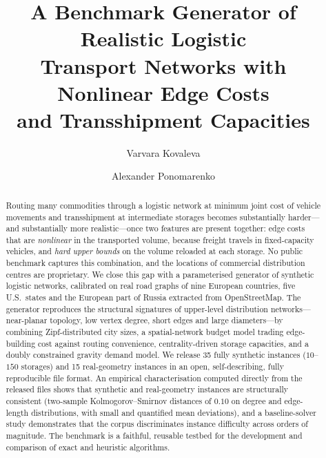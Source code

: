 \documentclass[runningheads]{llncs}
\begin{document}
\title{A Benchmark Generator of Realistic Logistic\\ Transport Networks with Nonlinear Edge Costs\\ and Transshipment Capacities}

\author{Varvara Kovaleva \and Alexander Ponomarenko}


\maketitle

\begin{abstract}
Routing many commodities through a logistic network at minimum joint cost of
vehicle movements and transshipment at intermediate storages becomes
substantially harder---and substantially more realistic---once two features are
present together: edge costs that are \emph{nonlinear} in the transported
volume, because freight travels in fixed-capacity vehicles, and \emph{hard
upper bounds} on the volume reloaded at each storage. No public benchmark
captures this combination, and the locations of commercial distribution centres
are proprietary. We close this gap with a parameterised generator of synthetic
logistic networks, calibrated on real road graphs of nine European countries,
five U.S.\ states and the European part of Russia extracted from OpenStreetMap.
The generator reproduces the structural signatures of upper-level distribution
networks---near-planar topology, low vertex degree, short edges and large
diameters---by combining Zipf-distributed city sizes, a spatial-network budget
model trading edge-building cost against routing convenience,
centrality-driven storage capacities, and a doubly constrained gravity demand
model. We release 35 fully synthetic instances ($10$--$150$ storages) and 15
real-geometry instances in an open, self-describing, fully reproducible file
format. An empirical characterisation computed directly from the released files
shows that synthetic and real-geometry instances are structurally consistent
(two-sample Kolmogorov--Smirnov distances of $0.10$ on degree and edge-length
distributions, with small and quantified mean deviations), and a baseline-solver
study demonstrates that the corpus discriminates instance difficulty across
orders of magnitude. The benchmark is a faithful, reusable testbed for the
development and comparison of exact and heuristic algorithms.

\end{abstract}
\end{document}
